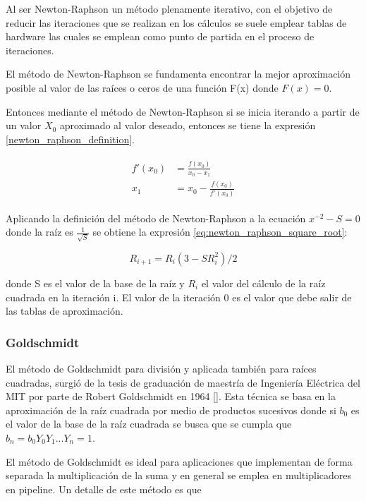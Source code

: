 Al ser Newton-Raphson un método plenamente iterativo, con el objetivo de reducir las iteraciones que se realizan en los cálculos se suele emplear tablas de hardware las cuales se emplean como punto de partida en el proceso de iteraciones.

El método de Newton-Raphson se fundamenta encontrar la mejor aproximación posible al valor de las raíces o ceros de una función F(x) donde $F(x)=0$. 

Entonces mediante el método de Newton-Raphson si se inicia iterando a partir de un valor $X_0$ aproximado al valor deseado, entonces se tiene la expresión \ref{newton_raphson_definition}.


\begin{align} \label{newton_raphson_definition}
\begin{split}
  f'(x_0) &= \frac{f(x_0)}{x_0-x_1} 
\\
  x_1 &= x_0-\frac{f(x_0)}{f'(x_0)} 
\end{split}  
\end{align} 


Aplicando la definición del método de Newton-Raphson a la ecuación $x^{-2}-S=0$ donde la raíz es $\frac{1}{\sqrt{S}}$ se obtiene la expresión \eqref{eq:newton_raphson_square_root}:

\begin{equation}
\label{eq:newton_raphson_square_root}
  R_{i+1}=R_{i}(3-SR_{i}^{2})/2
\end{equation}

donde S es el valor de la base de la raíz y $R_{i}$ el valor del cálculo de la raíz cuadrada en la iteración i. El valor de la iteración 0 es el valor que debe salir de las tablas de aproximación.


\subsubsection{Goldschmidt}

El método de Goldschmidt para división y aplicada también para raíces cuadradas, surgió de la tesis de graduación de maestría de Ingeniería Eléctrica del MIT por parte de Robert Goldschmidt en 1964 [\cite{Goldschmidt1964}]. Esta técnica se basa en la aproximación de la raíz cuadrada por medio de productos sucesivos donde si $b_{0}$ es el valor de la base de la raíz cuadrada se busca que se cumpla que $b_{n}=b_{0}Y_{0}Y_{1}...Y_{n}=1$.

El método de Goldschmidt es ideal para aplicaciones que implementan de forma separada la multiplicación de la suma y en general se emplea en multiplicadores en pipeline. Un detalle de este método es que 

